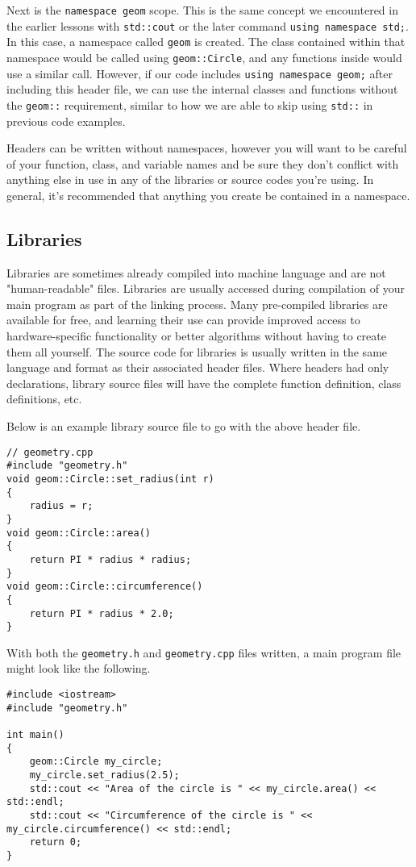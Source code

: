 Next is the \texttt{namespace geom} scope.  
This is the same concept we encountered in the earlier lessons with \texttt{std::cout} or the later command \texttt{using namespace std;}.  
In this case, a namespace called \texttt{geom} is created.  
The class contained within that namespace would be called using \texttt{geom::Circle}, and any functions inside would use a similar call.  
However, if our code includes \texttt{using namespace geom;} after including this header file, we can use the internal classes and functions without the \texttt{geom::} requirement, similar to how we are able to skip using \texttt{std::} in previous code examples.

Headers can be written without namespaces, however you will want to be careful of your function, class, and variable names and be sure they don't conflict with anything else in use in any of the libraries or source codes you're using.  In general, it's recommended that anything you create be contained in a namespace.

\subsection{Libraries}
Libraries are sometimes already compiled into machine language and are not "human-readable" files.  Libraries are usually accessed during compilation of your main program as part of the linking process.  Many pre-compiled libraries are available for free, and learning their use can provide improved access to hardware-specific functionality or better algorithms without having to create them all yourself.  The source code for libraries is usually written in the same language and format as their associated header files.  Where headers had only declarations, library source files will have the complete function definition, class definitions, etc.

Below is an example library source file to go with the above header file.

\begin{verbatim}
// geometry.cpp
#include "geometry.h"
void geom::Circle::set_radius(int r)
{
    radius = r;
}
void geom::Circle::area()
{
    return PI * radius * radius;
}
void geom::Circle::circumference()
{
    return PI * radius * 2.0;
}
\end{verbatim}

With both the \texttt{geometry.h} and \texttt{geometry.cpp} files written, a main program file might look like the following.

\begin{verbatim}
#include <iostream>
#include "geometry.h"

int main()
{
    geom::Circle my_circle;
    my_circle.set_radius(2.5);
    std::cout << "Area of the circle is " << my_circle.area() << std::endl;
    std::cout << "Circumference of the circle is " << my_circle.circumference() << std::endl;
    return 0;
}
\end{verbatim}

